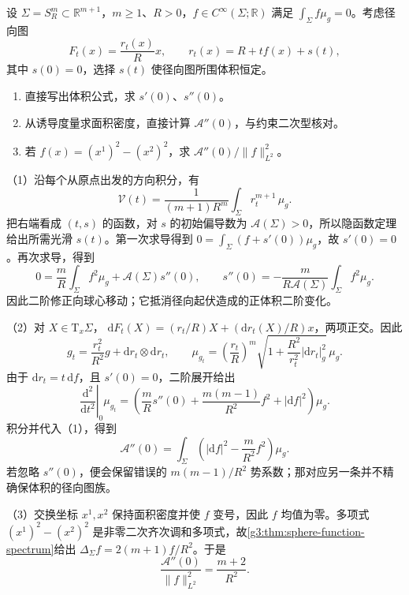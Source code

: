\begin{optionalexercise}\label{g3:ex:cmc-sphere-volume-correction}
	设 \(\Sigma=S_R^m\subset\mathbb R^{m+1}\)，\(m\ge1\)、\(R>0\)，\(f\in C^\infty(\Sigma;\mathbb R)\) 满足 \(\int_\Sigma f\mu_g=0\)。考虑径向图
	\[
		F_t(x)=\frac{r_t(x)}R x,
		\qquad r_t(x)=R+t f(x)+s(t),
	\]
	其中 \(s(0)=0\)，选择 \(s(t)\) 使径向图所围体积恒定。
	\begin{enumerate}
		\item 直接写出体积公式，求 \(s'(0)\)、\(s''(0)\)。
		\item 从诱导度量求面积密度，直接计算 \(\mathcal A''(0)\)，与约束二次型核对。
		\item 若 \(f(x)=(x^1)^2-(x^2)^2\)，求 \(\mathcal A''(0)/\|f\|_{L^2}^2\)。
	\end{enumerate}
\end{optionalexercise}
\begin{solution}
	（1）沿每个从原点出发的方向积分，有
	\[
		\mathcal V(t)=\frac1{(m+1)R^m}\int_\Sigma r_t^{m+1}\,\mu_g.
	\]
	把右端看成 \((t,s)\) 的函数，对 \(s\) 的初始偏导数为 \(\mathcal A(\Sigma)>0\)，所以隐函数定理给出所需光滑 \(s(t)\)。第一次求导得到
	\(0=\int_\Sigma(f+s'(0))\mu_g\)，故 \(s'(0)=0\)。再次求导，得到
	\[
		0=\frac mR\int_\Sigma f^2\mu_g+\mathcal A(\Sigma)s''(0),
		\qquad
		s''(0)=-\frac m{R\mathcal A(\Sigma)}\int_\Sigma f^2\mu_g.
	\]
	因此二阶修正向球心移动；它抵消径向起伏造成的正体积二阶变化。

	（2）对 \(X\in\mathrm T_x\Sigma\)，
	\(\mathrm dF_t(X)=(r_t/R)X+(\mathrm dr_t(X)/R)x\)，两项正交。因此
	\[
		g_t=\frac{r_t^2}{R^2}g+\mathrm dr_t\otimes\mathrm dr_t,
		\qquad
		\mu_{g_t}=\left(\frac{r_t}R\right)^m
		\sqrt{1+\frac{R^2}{r_t^2}|\mathrm dr_t|_g^2}\,\mu_g.
	\]
	由于 \(\mathrm dr_t=t\,\mathrm df\)，且 \(s'(0)=0\)，二阶展开给出
	\[
		\left.\frac{\mathrm d^2}{\mathrm dt^2}\right|_0\mu_{g_t}
		=\left(\frac mR s''(0)+\frac{m(m-1)}{R^2}f^2
		+|\mathrm df|^2\right)\mu_g.
	\]
	积分并代入（1），得到
	\[
		\mathcal A''(0)=\int_\Sigma\left(|\mathrm df|^2-\frac m{R^2}f^2\right)\mu_g.
	\]
	若忽略 \(s''(0)\)，便会保留错误的 \(m(m-1)/R^2\) 势系数；那对应另一条并不精确保体积的径向图族。

	（3）交换坐标 \(x^1,x^2\) 保持面积密度并使 \(f\) 变号，因此 \(f\) 均值为零。多项式 \((x^1)^2-(x^2)^2\) 是非零二次齐次调和多项式，故\cref{g3:thm:sphere-function-spectrum}给出
	\(\Delta_\Sigma f=2(m+1)f/R^2\)。于是
	\[
		\frac{\mathcal A''(0)}{\|f\|_{L^2}^2}=\frac{m+2}{R^2}.
	\]
\end{solution}

